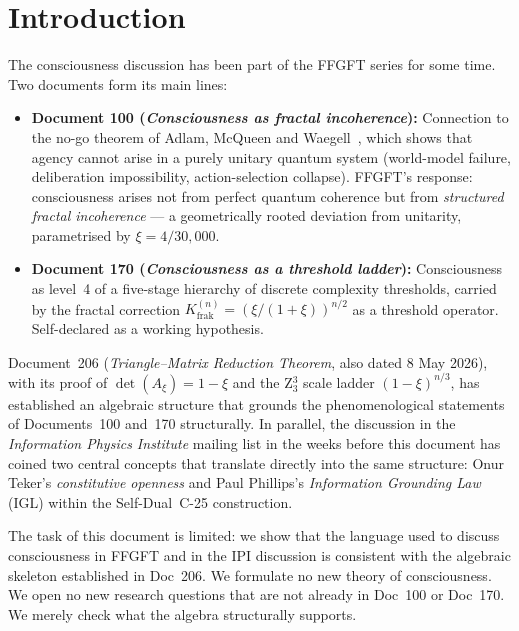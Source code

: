 
\section{Introduction}\label{sec:intro}

The consciousness discussion has been part of the FFGFT series for some time. Two documents form its main lines:

\begin{itemize}
\item \textbf{Document 100 (\emph{Consciousness as fractal incoherence}):} Connection to the no-go theorem of Adlam, McQueen and Waegell~\cite{Adlam2025}, which shows that agency cannot arise in a purely unitary quantum system (world-model failure, deliberation impossibility, action-selection collapse). FFGFT's response: consciousness arises not from perfect quantum coherence but from \emph{structured fractal incoherence} --- a geometrically rooted deviation from unitarity, parametrised by $\xi = 4/30{,}000$.
\item \textbf{Document 170 (\emph{Consciousness as a threshold ladder}):} Consciousness as level~4 of a five-stage hierarchy of discrete complexity thresholds, carried by the fractal correction $K_{\text{frak}}^{(n)} = (\xi/(1+\xi))^{n/2}$ as a threshold operator. Self-declared as a working hypothesis.
\end{itemize}

Document~206 (\emph{Triangle--Matrix Reduction Theorem}, also dated 8 May 2026), with its proof of $\det(A_\xi) = 1-\xi$ and the Z$_3^3$ scale ladder $(1-\xi)^{n/3}$, has established an algebraic structure that grounds the phenomenological statements of Documents~100 and~170 structurally. In parallel, the discussion in the \emph{Information Physics Institute} mailing list in the weeks before this document has coined two central concepts that translate directly into the same structure: Onur Teker's \emph{constitutive openness} and Paul Phillips's \emph{Information Grounding Law} (IGL) within the Self-Dual~C-25 construction.

\medskip

The task of this document is limited: we show that the language used to discuss consciousness in FFGFT and in the IPI discussion is consistent with the algebraic skeleton established in Doc~206. We formulate no new theory of consciousness. We open no new research questions that are not already in Doc~100 or Doc~170. We merely check what the algebra structurally supports.

